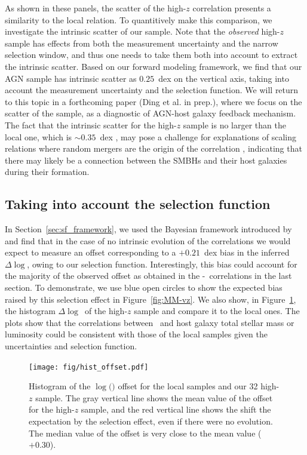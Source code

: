 \documentclass[apj]{emulateapj}
\begin{document}
As shown in these panels, the scatter of the high-$z$ correlation presents a similarity to the local relation. To quantitively make this comparison, we investigate the intrinsic scatter of our sample. Note that the {\it observed} high-$z$ sample has effects from both the measurement uncertainty and the narrow selection window, and thus one needs to take them both into account to extract the intrinsic scatter. Based on our forward modeling framework, we find that our AGN sample has intrinsic scatter as $0.25$~dex on the vertical axis, taking into account the measurement uncertainty and the selection function. We will return to this topic in a forthcoming paper (Ding et al. in prep.), where we focus on the scatter of the sample, as a diagnostic of AGN-host galaxy feedback mechanism. The fact that the intrinsic scatter for the high-$z$ sample is no larger than the local one, which is $\sim0.35$~dex \citep{Gul++09}, may pose a challenge for explanations of scaling relations where random mergers are the origin of the correlation \citep{Peng2007,Jahnke2011}, indicating that there may likely be a connection between the SMBHs and their host galaxies during their formation.

\subsection{Taking into account the selection function}
\label{select_eff}

In Section~\ref{sec:sf_framework}, we used the Bayesian framework introduced by \citet{Schulze2011} and find that in the case of no intrinsic evolution of the correlations we would expect to measure an offset corresponding to a $+0.21$~dex bias in the inferred $\Delta \log$\mbh, owing to our selection function. Interestingly, this bias could account for the majority of the observed offset as obtained in the \mbh-\smass\ correlations in the last section. %
To demonstrate, we use blue open circles to show the expected bias raised by this selection effect in Figure~\ref{fig:MM-vz}. We also show, in Figure~\ref{fig:offset_hist}, the histogram $\Delta \log$\mbh\ of the high-$z$ sample and compare it to the local ones. 
The plots show that the correlations between \mbh\ and host galaxy total stellar mass or luminosity could be consistent with those of the local samples given the uncertainties and selection function.


\begin{figure}
\centering
{
\texttt{[image: fig/hist\_offset.pdf]}
}
\caption{\label{fig:offset_hist} 
Histogram of the $\log($\mbh$)$ offset for the local samples and our 32 high-$z$ sample. The gray vertical line shows the mean value of the offset for the high-$z$ sample, and the red vertical line shows the shift the expectation by the selection effect, even if there were no evolution. The median value of the offset is very close to the mean value ($+0.30$).
}
\end{figure} 
\end{document}
